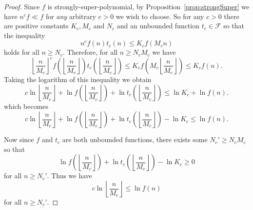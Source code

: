 \documentclass[11pt]{amsart}
\theoremstyle{definition}
\renewcommand{\geq}{\geqslant} \renewcommand{\leq}{\leqslant} \renewcommand{\ge}{\geqslant} \renewcommand{\le}{\leqslant}
\begin{document}
\begin{appendix}
 \begin{proof}
    Since $f$ is strongly-super-polynomial, by Proposition~\ref{prop:strongSuper} we have $n^cf\ll f$ for {\em any} arbitrary $c>0$ we wish to choose.
    So for any $c>0$ there are positive constants
    $K_c,M_c$ and $N_c$ and
    an unbounded function $t_c \in \mathcal{F}$
    so that
    the inequality
    \begin{equation*}
    	n^c f(n) t_c(n) \leqslant K_c f(M_cn)
    \end{equation*} 	
    holds for all $n \geq N_c$.
    Therefore, for all $n \geq N_cM_c$ we have
    \begin{equation*}
    \label{str_sup_pol_eq1}
       \left\lfloor \frac{n}{M_c}
       \right\rfloor^c
       f\left( \left\lfloor \frac{n}{M_c}
       \right\rfloor\right)
       t_c\left(\left\lfloor \frac{n}{M_c}
       \right\rfloor\right) \leqslant K_c
       f \left( M_c \left\lfloor \frac{n}{M_c}
       \right\rfloor\right) \leqslant K_c f (n).
    \end{equation*}
    Taking the logarithm of this inequality
    we obtain
    \begin{equation*}
    \label{str_sup_pol_eq2}
       c \ln \left\lfloor \frac{n}{M_c}
       \right\rfloor +
       \ln f\left( \left\lfloor \frac{n}{M_c}
       \right\rfloor\right)  +  \ln t_c \left(\left\lfloor \frac{n}{M_c}
       \right\rfloor\right) \leqslant
       \ln K_c  + \ln f (n).
    \end{equation*}
    which becomes
        \begin{equation*}
    \label{str_sup_pol_eq3}
       c \ln \left\lfloor \frac{n}{M_c}
       \right\rfloor +
       \ln f\left( \left\lfloor \frac{n}{M_c}
       \right\rfloor\right)  +  \ln t_c \left(\left\lfloor \frac{n}{M_c}
       \right\rfloor\right) - \ln K_c\leqslant
         \ln f (n).
    \end{equation*}


    Now since $f$ and $t_c$ are both unbounded functions, there exists some  $N_c'\geq N_cM_c$ so that \[\ln f\left( \left\lfloor \frac{n}{M_c}
       \right\rfloor\right)  +  \ln t_c \left(\left\lfloor \frac{n}{M_c}
       \right\rfloor\right)-\ln K_c\geq 0\]
       for all $n\geq N_c'$. Thus we have
               \begin{equation*}
    \label{str_sup_pol_eq4}
       c \ln \left\lfloor \frac{n}{M_c}
       \right\rfloor
      \leq
         \ln f (n)
    \end{equation*} for all $n\geq N_c'$.


\end{proof}
\end{appendix}
\end{document}
